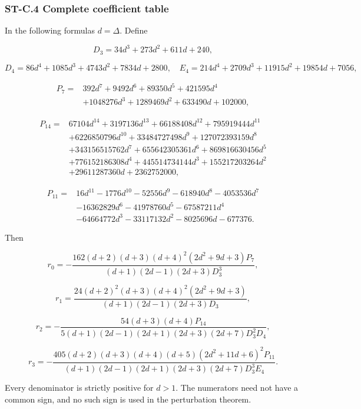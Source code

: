 \hypertarget{st-c.4-complete-coefficient-table}{%
\subsubsection{ST-C.4 Complete coefficient table}\label{st-c.4-complete-coefficient-table}}

In the following formulas \(d=\Delta\). Define

\[
D_3=34d^3+273d^2+611d+240,
\]

\[
D_4=86d^4+1085d^3+4743d^2+7834d+2800,
\quad
E_4=214d^4+2709d^3+11915d^2+19854d+7056,
\]

\[
\begin{aligned}
P_7={}&392d^7+9492d^6+89350d^5+421595d^4\\
&+1048276d^3+1289469d^2+633490d+102000,
\end{aligned}
\]

\[
\begin{aligned}
P_{14}={}&67104d^{14}+3197136d^{13}+66188408d^{12}
+795919444d^{11}\\
&+6226850796d^{10}+33484727498d^9+127072393159d^8\\
&+343156515762d^7+655642305361d^6+869816630456d^5\\
&+776152186308d^4+445514734144d^3+155217203264d^2\\
&+29611287360d+2362752000,
\end{aligned}
\]

\[
\begin{aligned}
P_{11}={}&16d^{11}-1776d^{10}-52556d^9-618940d^8-4053536d^7\\
&-16362829d^6-41978760d^5-67587211d^4\\
&-64664772d^3-33117132d^2-8025696d-677376.
\end{aligned}
\]

Then

\[
r_0=-\frac{162(d+2)(d+3)(d+4)^2(2d^2+9d+3)P_7}
{(d+1)(2d-1)(2d+3)D_3^3},
\]

\[
r_1=\frac{24(d+2)^2(d+3)(d+4)^2(2d^2+9d+3)}
{(d+1)(2d-1)(2d+3)D_3},
\]

\[
r_2=-\frac{54(d+3)(d+4)P_{14}}
{5(d+1)(2d-1)(2d+1)(2d+3)(2d+7)D_3^2D_4},
\]

\[
r_3=-\frac{405(d+2)(d+3)(d+4)(d+5)(2d^2+11d+6)^2P_{11}}
{(d+1)(2d-1)(2d+1)(2d+3)(2d+7)D_3^3E_4}.
\]

Every denominator is strictly positive for \(d>1\). The numerators need not have a common sign, and no such sign is used in the perturbation theorem.

